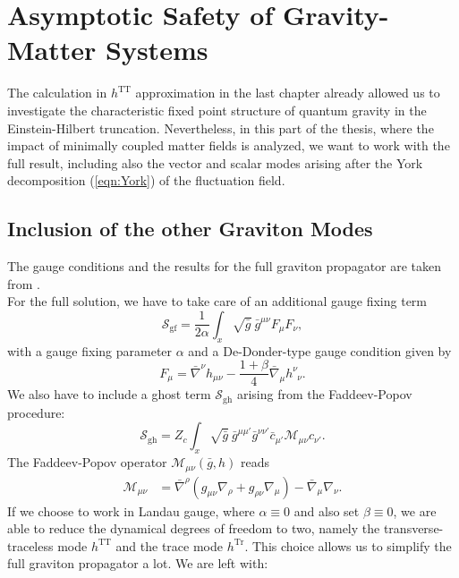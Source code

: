 \chapter{Asymptotic Safety of Gravity-Matter Systems}\label{chap:Matter} 
The calculation in $h^{\mathrm{TT}}$ approximation in the last chapter already allowed us to investigate the characteristic fixed point structure of quantum gravity in the Einstein-Hilbert truncation. Nevertheless, in this part of the thesis, where the impact of minimally coupled matter fields is analyzed, we want to work with the full result, including also the vector and scalar modes arising after the York decomposition (\ref{eqn:York}) of the fluctuation field. 

\section{Inclusion of the other Graviton Modes}
The gauge conditions and the results for the full graviton propagator are taken from \cite{PawlowskiNPgaugeLecture}.\\
For the full solution, we have to take care of an additional gauge fixing term
\begin{equation}
\mathcal{S}_{\mathrm{gf}} = \frac{1}{2\alpha} \int_x \sqrt{\bar{g}} \  \bar{g}^{\mu\nu} F_{\mu}F_{\nu},
\end{equation}
with a gauge fixing parameter $\alpha$ and a De-Donder-type gauge condition given by
\begin{equation}
	F_{\mu} = \bar{\nabla}^{\nu}h_{\mu\nu} - \frac{1+\beta}{4}\bar{\nabla}_{\mu}h^{\nu}_{\phantom{\nu}\nu}. 
\end{equation}
We also have to include a ghost term $\mathcal{S}_{\mathrm{gh}}$ arising from the Faddeev-Popov procedure:
\begin{equation}
\mathcal{S}_{\mathrm{gh}} = Z_c\int_x \sqrt{\bar{g}} \  \bar{g}^{\mu\mu'} \bar{g}^{\nu\nu'}\bar{c}_{\mu'} \mathcal{M}_{\mu\nu}  c_{\nu'}.
\label{eqn:ghost_action}
\end{equation}
 The Faddeev-Popov operator $\mathcal{M}_{\mu\nu}(\bar{g},h)$ reads
\begin{align}
	\mathcal{M}_{\mu\nu} &= \bar{\nabla}^{\rho}(g_{\mu\nu}\nabla_{\rho} + g_{\rho\nu}\nabla_{\mu}) - \bar{\nabla}_{\mu}\nabla_{\nu}.
	\label{eqn:FPop}
\end{align}
If we choose to work in Landau gauge, where $\alpha \equiv 0$ and also set $\beta\equiv 0$, we are able to reduce the dynamical degrees of freedom to two, namely the transverse-traceless mode $h^{\mathrm{TT}}$ and the trace mode $h^{\mathrm{Tr}}$. This choice allows us to simplify the full graviton propagator a lot. We are left with:
